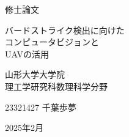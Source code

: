 \documentclass[a4paper, 12pt]{report}
\begin{document}
\renewcommand{\abstractname}{概要}
\renewcommand{\contentsname}{目次}
\renewcommand{\figurename}{図}
\renewcommand{\tablename}{表}
\renewcommand{\bibname}{参考文献}

\setcounter{chapter}{1}

\begin{titlepage}
    \begin{center}

        {\Large 修士論文}

        \vspace{160pt}

        {\Huge バードストライク検出に向けた}\\
        {\Huge コンピュータビジョンと}\\
        {\Huge UAVの活用}  

        \vspace{160pt}

        {\LARGE 山形大学大学院}\\
        {\LARGE 理工学研究科数理科学分野}

        \vspace{10pt}

        {\LARGE 23321427 千葉歩夢}

        \vspace{80pt}

        {\Large 2025年2月}   

    \end{center}
\end{titlepage}

\newpage
\end{document}
